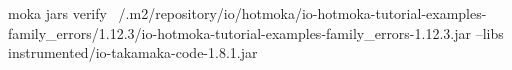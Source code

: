 \begin{shellcommandbox}\begin{ttlst}
moka jars verify ~/.m2/repository/io/hotmoka/io-hotmoka-tutorial-examples-family_errors/1.12.3/io-hotmoka-tutorial-examples-family_errors-1.12.3.jar --libs instrumented/io-takamaka-code-1.8.1.jar
\end{ttlst}\end{shellcommandbox}

